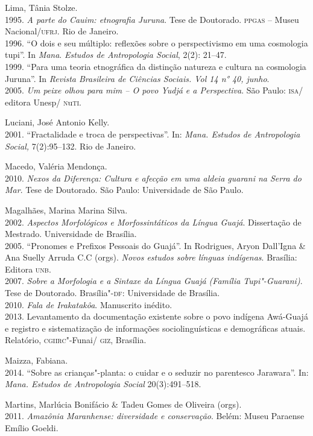 \begin{bibliohedra}
Lima, Tânia Stolze.\\
1995. \emph{A parte do Cauim: etnografia Juruna}. Tese de
Doutorado. \textsc{ppgas} -- Museu Nacional/\textsc{ufrj}. Rio de Janeiro.\\
1996. ``O dois e seu múltiplo: reflexões sobre o perspectivismo
em uma cosmologia tupi''. In \emph{Mana}. \emph{Estudos de Antropologia
Social}, 2(2): 21--47.\\
1999. ``Para uma teoria etnográfica da distinção natureza e
cultura na cosmologia Juruna''. In \emph{Revista Brasileira de Ciências
Sociais. Vol 14 n° 40, junho}.\\
2005. \emph{Um peixe olhou para mim -- O povo Yudjá e a
Perspectiva}. São Paulo: \textsc{isa}/ editora Unesp/ \textsc{n}u\textsc{ti}.

Luciani, José Antonio Kelly.\\
2001. ``Fractalidade e troca de perspectivas''. In: \emph{Mana.
Estudos de Antropologia Social,} 7(2):95--132. Rio de Janeiro.

Macedo, Valéria Mendonça.\\
2010. \emph{Nexos da Diferença: Cultura e afecção em uma aldeia
guarani na Serra do Mar}. Tese de Doutorado. São Paulo: Universidade de
São Paulo.

Magalhães, Marina Marina Silva.\\
2002. \emph{Aspectos Morfológicos e Morfossintáticos da Língua
Guajá}. Dissertação de Mestrado. Universidade de Brasília.\\
2005. ``Pronomes e Prefixos Pessoais do Guajá''. In Rodrigues,
Aryon Dall'Igna \& Ana Suelly Arruda C.C (orgs). \emph{Novos estudos
sobre línguas indígenas}. Brasília: Editora \textsc{unb}.\\
2007. \emph{Sobre a Morfologia e a Sintaxe da Língua Guajá
(Família Tupi"-Guarani)}. Tese de Doutorado. Brasília"-\textsc{df}: Universidade de
Brasília.\\
2010. \emph{Fala de Irakatakôa}. Manuscrito inédito.\\
2013. Levantamento da documentação existente sobre o povo
indígena Awá-Guajá e registro e sistematização de informações
sociolinguísticas e demográficas atuais. Relatório, \textsc{cgiirc}"-Funai/ \textsc{giz},
Brasília.

Maizza, Fabiana.\\
2014. ``Sobre as crianças"-planta: o cuidar e o seduzir no
parentesco Jarawara''. In: \emph{Mana. Estudos de Antropologia Social}
20(3):491--518.

Martins, Marlúcia Bonifácio \& Tadeu Gomes de Oliveira (orgs).\\
2011. \emph{Amazônia Maranhense: diversidade e conservação}.
Belém: Museu Paraense Emílio Goeldi.


\end{bibliohedra}
